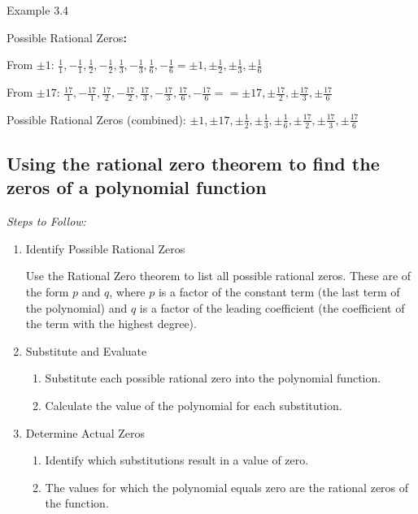 \begin{example}{Example 3.4}
\begin{enumerate}
  Possible Rational Zeros\textbf{:}

  From $\pm 1$: $\frac{1}{1}, -\frac{1}{1}, \frac{1}{2}, -\frac{1}{2}, \frac{1}{3},
  -\frac{1}{3}, \frac{1}{6}, -\frac{1}{6} = \pm 1, \pm\frac{1}{2}, \pm\frac{1}{3},
  \pm\frac{1}{6}$

  From $\pm 17$: $\frac{17}{1}, -\frac{17}{1}, \frac{17}{2}, -\frac{17}{2},
  \frac{17}{3}, -\frac{17}{3}, \frac{17}{6}, -\frac{17}{6} = = \pm 17,
  \pm\frac{17}{2}, \pm\frac{17}{3}, \pm\frac{17}{6}$

  Possible Rational Zeros (combined): $\pm 1, \pm 17, \pm\frac{1}{2}, \pm\frac{1}{3},
  \pm\frac{1}{6}, \pm\frac{17}{2}, \pm\frac{17}{3}, \pm\frac{17}{6}$
\end{enumerate}
\end{example}

\subsection{Using the rational zero theorem to find the zeros of a polynomial function}

\noindent\textit{Steps to Follow:}
\begin{enumerate}
  \item Identify Possible Rational Zeros

  Use the Rational Zero theorem to list all possible rational zeros. These are
  of the form $p$ and $q$, where $p$ is a factor of the constant term (the last term of
  the polynomial) and $q$ is a factor of the leading coefficient (the coefficient of
  the term with the highest degree).
  \item Substitute and Evaluate
  \begin{enumerate}
    \item[a.] Substitute each possible rational zero into the polynomial function.
    \item[b.] Calculate the value of the polynomial for each substitution.
  \end{enumerate}
  \item Determine Actual Zeros
  \begin{enumerate}
    \item[a.] Identify which substitutions result in a value of zero.
    \item[b.] The values for which the polynomial equals zero are the rational zeros
    of the function.
  \end{enumerate}
\end{enumerate}

